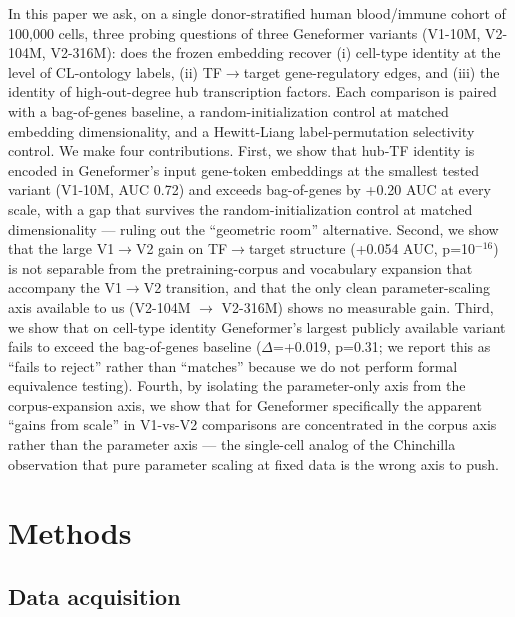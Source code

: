 \documentclass[10pt]{article}
\begin{document}
In this paper we ask, on a single donor-stratified human blood/immune
cohort of 100,000 cells, three probing questions of three Geneformer
variants (V1-10M, V2-104M, V2-316M): does the frozen embedding recover
(i) cell-type identity at the level of CL-ontology labels, (ii)
TF$\to$target gene-regulatory edges, and (iii) the identity of
high-out-degree hub transcription factors. Each comparison is paired
with a bag-of-genes baseline, a random-initialization control at matched
embedding dimensionality, and a Hewitt-Liang label-permutation
selectivity control. We make four contributions. First, we show that
hub-TF identity is encoded in Geneformer's input gene-token embeddings
at the smallest tested variant (V1-10M, AUC 0.72) and exceeds
bag-of-genes by +0.20 AUC at every scale, with a gap that survives the
random-initialization control at matched dimensionality --- ruling out
the ``geometric room'' alternative. Second, we show that the large V1$\to$V2
gain on TF$\to$target structure (+0.054 AUC, p=10$^{-16}$) is not separable from
the pretraining-corpus and vocabulary expansion that accompany the V1$\to$V2
transition, and that the only clean parameter-scaling axis available to
us (V2-104M $\to$ V2-316M) shows no measurable gain. Third, we show that on
cell-type identity Geneformer's largest publicly available variant fails
to exceed the bag-of-genes baseline ($\Delta$=+0.019, p=0.31; we report this as
``fails to reject'' rather than ``matches'' because we do not perform
formal equivalence testing). Fourth, by isolating the parameter-only
axis from the corpus-expansion axis, we show that for Geneformer
specifically the apparent ``gains from scale'' in V1-vs-V2 comparisons
are concentrated in the corpus axis rather than the parameter axis ---
the single-cell analog of the Chinchilla observation that pure parameter
scaling at fixed data is the wrong axis to push.

\section{Methods}\label{methods}

\subsection{Data acquisition}\label{data-acquisition}
\end{document}
